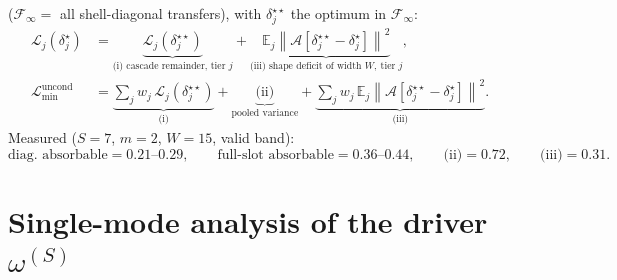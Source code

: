 \documentclass[11pt]{article}
\newcommand{\norm}[1]{\left\lVert #1 \right\rVert}
\newcommand{\E}{\mathbb{E}}
\begin{document}
($\mathcal{F}_\infty=$ all shell-diagonal transfers), with
$\delta^{\star\star}_j$ the optimum in $\mathcal{F}_\infty$:
\begin{align}
\mathcal{L}_j(\delta^\star_j)
&=\underbrace{\mathcal{L}_j(\delta^{\star\star}_j)}
_{\text{(i) cascade remainder, tier }j}
+\underbrace{\E_j\norm{\mathcal{A}
[\delta^{\star\star}_j-\delta^{\star}_j]}^{2}}
_{\text{(iii) shape deficit of width }W,\ \text{tier }j},\\
\mathcal{L}_{\min}^{\mathrm{uncond}}
&=\underbrace{\sum_j w_j\,\mathcal{L}_j(\delta^{\star\star}_j)}_{\text{(i)}}
+\underbrace{\text{(ii)}}_{\text{pooled variance}}
+\underbrace{\sum_j w_j\,\E_j\norm{\mathcal{A}
[\delta^{\star\star}_j-\delta^{\star}_j]}^{2}}_{\text{(iii)}}.
\end{align}
Measured ($S=7$, $m=2$, $W=15$, valid band):
\begin{equation}
\text{diag.\ absorbable}=0.21\text{--}0.29,\qquad
\text{full-slot absorbable}=0.36\text{--}0.44,\qquad
\text{(ii)}=0.72,\qquad \text{(iii)}=0.31 .
\end{equation}

\section{Single-mode analysis of the driver $\omega^{(S)}$}
\end{document}
